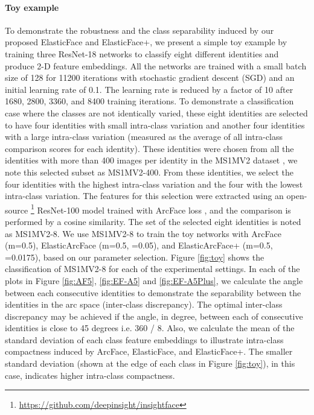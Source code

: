 \documentclass[letterpaper, 10 pt, conference]{ieeeconf}  \usepackage{times}
\begin{document}
\paragraph{Toy example}
To demonstrate the robustness and the class separability induced by our proposed ElasticFace and ElasticFace+, we present a simple toy example by training three ResNet-18 networks \cite{DBLP:conf/cvpr/HeZRS16} to classify eight different identities and produce 2-D feature embeddings.  
All the networks are trained with a small batch size of 128 for 11200 iterations with stochastic gradient descent (SGD) and an initial learning rate of 0.1. The learning rate is reduced by a factor of 10 after 1680, 2800, 3360, and 8400 training iterations.
To demonstrate a classification case where the classes are not identically varied, these eight identities are selected to have four identities with small intra-class variation and another four identities with a large intra-class variation (measured as the average of all intra-class comparison scores for each identity).
These identities were chosen from all the identities with more than 400 images per identity in the MS1MV2 dataset \cite{deng2019arcface}, we note this selected subset as MS1MV2-400.
From these identities, we select the four identities with the highest intra-class variation and the four with the lowest intra-class variation. 
The features for this selection were extracted using an open-source \footnote {\url{https://github.com/deepinsight/insightface}} ResNet-100 \cite{DBLP:conf/cvpr/HeZRS16} model trained with ArcFace loss \cite{deng2019arcface}, and the comparison is performed by a cosine similarity. The set of the selected eight identities is noted as MS1MV2-8.
We use MS1MV2-8 to train the toy networks with ArcFace (m=0.5), ElasticArcFace (m=0.5, =0.05), and 
ElasticArcFace+ (m=0.5, =0.0175), based on our parameter selection.
Figure \ref{fig:toy} shows the classification of MS1MV2-8 for each of the experimental settings. In each of the plots in Figure
\ref{fig:AF5}, \ref{fig:EF-A5} and \ref{fig:EF-A5Plus}, we calculate the angle between each consecutive identities to demonstrate the separability between the identities in the arc space (inter-class discrepancy).  The optimal inter-class discrepancy may be achieved if the angle, in degree, between each of consecutive identities is close to 45 degrees i.e. 360 / 8. Also, we calculate the mean of the standard deviation of each class feature embeddings to illustrate intra-class compactness induced by ArcFace, ElasticFace, and ElasticFace+. The smaller standard deviation (shown at the edge of each class in Figure \ref{fig:toy}), in this case, indicates higher intra-class compactness.
\end{document}
